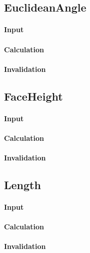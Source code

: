 \subsection{EuclideanAngle}

\paragraph{Input}

\paragraph{Calculation}

\paragraph{Invalidation}

\bigskip

\subsection{FaceHeight}

\paragraph{Input}

\paragraph{Calculation}

\paragraph{Invalidation}

\bigskip

\subsection{Length}

\paragraph{Input}

\paragraph{Calculation}

\paragraph{Invalidation}

